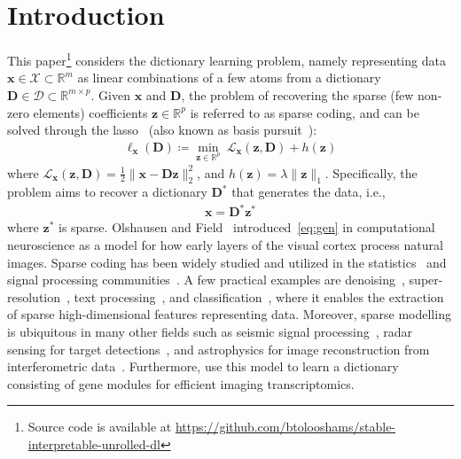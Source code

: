 \documentclass[10pt]{article} %
\newcommand{\R}{\mathbb{R}} %
\newcommand{\D}{{\bm D}}
\newcommand{\x}{{\bm x}}
\newcommand{\z}{{\bm z}}
\newcommand{\Loss}{\mathcal{L}}
\newcommand{\loss}{\ell}
\newcommand{\X}{\mathcal{X}}
\newcommand{\Dcal}{\mathcal{D}}
\begin{document}
\section{Introduction}\label{sec:intro}
This paper\footnote{Source code is available at \url{https://github.com/btolooshams/stable-interpretable-unrolled-dl}} considers the dictionary learning problem, namely representing data $\x \in \X \subset \R^m$ as linear combinations of a few atoms from a dictionary $\D \in \Dcal \subset \R^{m \times p}$. Given $\x$ and $\D$, the problem of recovering the sparse (few non-zero elements) coefficients $\z \in \R^p$ is referred to as sparse coding, and can be solved through the lasso~\citep{tibshirani1996lasso} (also known as basis pursuit~\citep{chen2001atomic}):
\begin{equation}\label{eq:lasso}
\begin{array}{c}
\loss_{\x}(\D) \coloneqq \min_{\z \in \R^p}\ \Loss_{\x}(\z, \D) + h(\z)
\end{array}
\end{equation}
where $\Loss_{\x}(\z, \D) = \frac{1}{2} \| \x - \D \z \|_2^2$, and $h(\z) = \lambda \| \z \|_1$. Specifically, the problem aims to recover a dictionary $\D^*$ that generates the data, i.e.,
\begin{equation}\label{eq:gen}
\begin{array}{c}
\x =  \D^{\ast} \z^{\ast}
\end{array}
\end{equation}
where $\z^{\ast}$ is sparse. Olshausen and Field~\citep{olshausen1997sparse} introduced~\eqref{eq:gen} in computational neuroscience as a model for how early layers of the visual cortex process natural images. Sparse coding has been widely studied and utilized in the statistics~\citep{hastie2015statistical} and signal processing communities~\citep{elad2010sparse}. A few practical examples are denoising~\citep{elad2016denoise}, super-resolution~\citep{yang2010superres}, text processing~\citep{jenatton2011proximal}, and classification~\citep{mairal2009supdl}, where it enables the extraction of sparse high-dimensional features representing data. Moreover, sparse modelling is ubiquitous in many other fields such as seismic signal processing~\citep{filho2018seismic}, radar sensing for target detections~\citep{bajwa2011radar}, and astrophysics for image reconstruction from interferometric data~\citep{akiyama2017imaging}. Furthermore, \citet{cleary2017trans, cleary2021compressed} use this model to learn a dictionary consisting of gene modules for efficient imaging transcriptomics.
\end{document}
